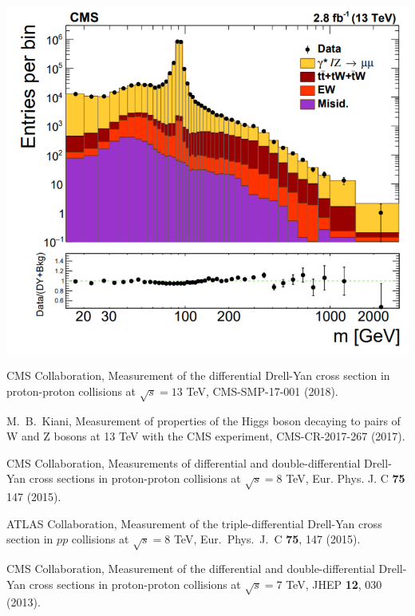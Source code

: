 \documentclass[a4paper,10pt,english]{article}
\begin{document}
\begin{minipage}{0.49\textwidth}
	\begin{center}
		\includegraphics[width=.99\linewidth]{Figure2.png}
	\end{center}
\end{minipage}
\vspace{-0.2cm}

\vspace{0.3cm}
\begin{thebibliography}{References}

CMS Collaboration, Measurement of the differential Drell-Yan cross section in proton-proton collisions at $\sqrt{s}=13$ TeV, CMS-SMP-17-001 (2018).

M.\ B.\ Kiani, Measurement of properties of the Higgs boson decaying to pairs of W and Z bosons at 13 TeV with the
CMS experiment, CMS-CR-2017-267 (2017).

CMS Collaboration, Measurements of differential and double-differential Drell-Yan cross sections in proton-proton
collisions at $\sqrt{s}=8$ TeV, Eur. Phys. J. C \textbf{75} 147 (2015).

ATLAS Collaboration, Measurement of the triple-differential Drell-Yan cross section in $pp$ collisions at $\sqrt{s}=8$ TeV,
Eur.\ Phys.\ J.\ C \textbf{75}, 147 (2015).

CMS Collaboration, Measurement of the differential and double-differential Drell-Yan cross sections in proton-proton collisions
at $\sqrt{s}=7$ TeV, JHEP \textbf{12}, 030 (2013).

\end{thebibliography}
\end{document}
